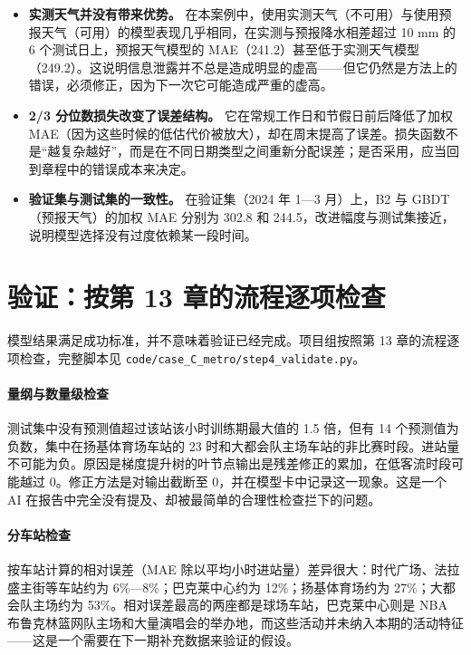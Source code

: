 \begin{itemize}
  \item \textbf{实测天气并没有带来优势。} 在本案例中，使用实测天气（不可用）与使用预报天气（可用）的模型表现几乎相同，在实测与预报降水相差超过 10 mm 的 6 个测试日上，预报天气模型的 MAE（241.2）甚至低于实测天气模型（249.2）。这说明信息泄露并不总是造成明显的虚高——但它仍然是方法上的错误，必须修正，因为下一次它可能造成严重的虚高。
  \item \textbf{2/3 分位数损失改变了误差结构。} 它在常规工作日和节假日前后降低了加权 MAE（因为这些时候的低估代价被放大），却在周末提高了误差。损失函数不是“越复杂越好”，而是在不同日期类型之间重新分配误差；是否采用，应当回到章程中的错误成本来决定。
  \item \textbf{验证集与测试集的一致性。} 在验证集（2024 年 1—3 月）上，B2 与 GBDT（预报天气）的加权 MAE 分别为 302.8 和 244.5，改进幅度与测试集接近，说明模型选择没有过度依赖某一段时间。
\end{itemize}

\section{验证：按第 13 章的流程逐项检查}

模型结果满足成功标准，并不意味着验证已经完成。项目组按照第 13 章的流程逐项检查，完整脚本见 \texttt{code/case\_C\_metro/step4\_validate.py}。

\paragraph{量纲与数量级检查} 测试集中没有预测值超过该站该小时训练期最大值的 1.5 倍，但有 14 个预测值为负数，集中在扬基体育场车站的 23 时和大都会队主场车站的非比赛时段。进站量不可能为负。原因是梯度提升树的叶节点输出是残差修正的累加，在低客流时段可能越过 0。修正方法是对输出截断至 0，并在模型卡中记录这一现象。这是一个 AI 在报告中完全没有提及、却被最简单的合理性检查拦下的问题。

\paragraph{分车站检查} 按车站计算的相对误差（MAE 除以平均小时进站量）差异很大：时代广场、法拉盛主街等车站约为 6\%—8\%；巴克莱中心约为 12\%；扬基体育场约为 27\%；大都会队主场约为 53\%。相对误差最高的两座都是球场车站，巴克莱中心则是 NBA 布鲁克林篮网队主场和大量演唱会的举办地，而这些活动并未纳入本期的活动特征——这是一个需要在下一期补充数据来验证的假设。

